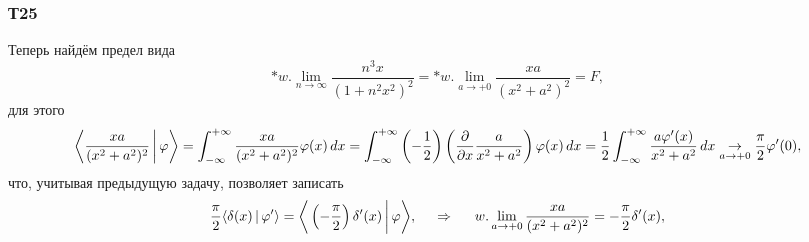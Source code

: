 \subsubsection*{Т25}

Теперь найдём предел вида
\begin{equation*}
    * w. \lim_{n\to \infty} \frac{n^3 x}{(1+n^2 x^2)^2} = 
    * w. \lim_{a \to +0} \frac{x a}{(x^2+a^2)^2} = F,
\end{equation*}
для этого 
\begin{equation*}
    \bigg\langle \frac{xa}{(x^2+a^2)^2} \,\bigg|\, \varphi \bigg\rangle  = 
    \int_{-\infty}^{+\infty} \frac{xa}{(x^2+a^2)^2} \varphi(x) \, d x = \int_{-\infty}^{+\infty} 
    \left(-\frac{1}{2}\right)\left(
        \frac{\partial }{\partial x} \frac{a}{x^2 + a^2}
    \right) \varphi(x) \, d x = 
    \frac{1}{2} \int_{-\infty}^{+\infty}  \frac{a \varphi'(x)}{x^2 + a^2} \, d x \underset{a\to+0}{\to} \frac{\pi}{2} \varphi'(0),
\end{equation*}
что, учитывая предыдущую задачу, позволяет записать
\begin{equation*}
     \frac{\pi}{2} \langle \delta(x) \,|\, \varphi' \rangle = \bigg\langle \left(-\frac{\pi}{2}\right)\delta'(x)   \,\bigg|\, \varphi \bigg\rangle,
     \hspace{0.5cm} \Rightarrow \hspace{0.5cm}
     w. \lim_{a \to +0} \frac{x a}{(x^2+a^2)^2}  = -\frac{\pi}{2}\delta'(x), 
\end{equation*}